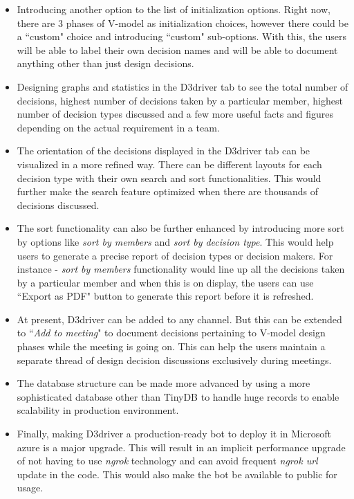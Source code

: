 \begin{itemize}
\item Introducing another option to the list of initialization options. Right now, there are 3 phases of V-model as initialization choices, however there could be a ``custom" choice and introducing ``custom" sub-options. With this, the users will be able to label their own decision names and will be able to document anything other than just design decisions. 

\item Designing graphs and statistics in the D3driver tab to see the total number of decisions, highest number of decisions taken by a particular member, highest number of decision types discussed and a few more useful facts and figures depending on the actual requirement in a team. 

\item The orientation of the decisions displayed in the D3driver tab can be visualized in a more refined way. There can be different layouts for each decision type with their own search and sort functionalities. This would further make the search feature optimized when there are thousands of decisions discussed. 

\item The sort functionality can also be further enhanced by introducing more sort by options like \textit{sort by members} and \textit{sort by decision type}. This would help users to generate a precise report of decision types or decision makers. For instance - \textit{sort by members} functionality would line up all the decisions taken by a particular member and when this is on display, the users can use ``Export as PDF" button to generate this report before it is refreshed.

\item At present, D3driver can be added to any channel. But this can be extended  to ``\textit{Add to meeting}" to document decisions pertaining to V-model design phases while the meeting is going on. This can help the users maintain a separate thread of design decision discussions exclusively during meetings. 

\item The database structure can be made more advanced by using a more sophisticated database other than TinyDB to handle huge records to enable scalability in production environment.

\item Finally, making D3driver a production-ready bot to deploy it in Microsoft azure is a major upgrade. This will result in an implicit performance upgrade of not having to use \textit{ngrok} technology and can avoid frequent \textit{ngrok url} update in the code. This would also make the bot be available to public for usage. 


\end{itemize}

